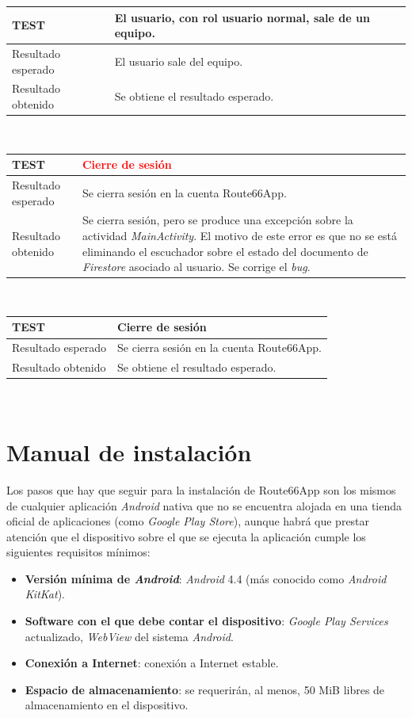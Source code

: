 \documentclass[twoside]{report}
\newcommand\addrow[2]{#1 &#2\\ }
\newcommand\addheading[2]{#1 &#2\\ \hline}
\newcommand\tabularhead{\begin{tabular}{lp{0.7\textwidth}}
\hline
}
\newenvironment{test}{\tabularhead}
{\hline\end{tabular}}
\begin{document}
\begin{test}
 \addheading{\textbf{TEST\arabic{test}}}{El usuario, con rol usuario normal, sale de un equipo.}
 \addrow{Resultado esperado}{El usuario sale del equipo.}
 \addrow{Resultado obtenido}{Se obtiene el resultado esperado.}
\end{test}\\

\vspace{0.5cm}

\begin{test}
 \addheading{\textbf{TEST\arabic{test}}}{\textcolor{red}{Cierre de sesión}}
 \addrow{Resultado esperado}{Se cierra sesión en la cuenta Route66App.}
 \addrow{Resultado obtenido}{Se cierra sesión, pero se produce una excepción sobre la actividad 			\textit{MainActivity}. El motivo de este error es que no se está eliminando el escuchador sobre el estado del documento de \textit{Firestore} asociado al usuario. Se corrige el \textit{bug}.}
\end{test}\\

\vspace{0.5cm}

\begin{test}
 \addheading{\textbf{TEST\arabic{test}}}{Cierre de sesión}
 \addrow{Resultado esperado}{Se cierra sesión en la cuenta Route66App.}
 \addrow{Resultado obtenido }{Se obtiene el resultado esperado.}
\end{test}\\


\section{Manual de instalación}

Los pasos que hay que seguir para la instalación de Route66App son los mismos de cualquier aplicación \textit{Android} nativa que no se encuentra alojada en una tienda oficial de aplicaciones (como \textit{Google Play Store}), aunque habrá que prestar atención que el dispositivo sobre el que se ejecuta la aplicación cumple los siguientes requisitos mínimos:

\begin{itemize}
	\item \textbf{Versión mínima de \textit{Android}}: \textit{Android} 4.4 (más conocido como \textit{Android KitKat}).
	\item \textbf{Software con el que debe contar el dispositivo}: \textit{Google Play Services} actualizado, \textit{WebView} del sistema \textit{Android}.
	\item \textbf{Conexión a Internet}: conexión a Internet estable.
	\item \textbf{Espacio de almacenamiento}: se requerirán, al menos, 50 MiB libres de almacenamiento en el dispositivo.
\end{itemize}
\end{document}
